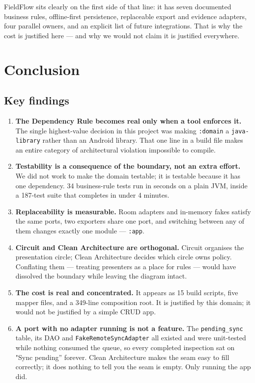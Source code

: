 \documentclass[11pt,a4paper]{article}
\newcommand{\mdl}[1]{\texttt{#1}}
\newcommand{\file}[1]{{\small\texttt{#1}}}
\begin{document}
FieldFlow sits clearly on the first side of that line: it has seven documented
business rules, offline-first persistence, replaceable export and evidence
adapters, four parallel owners, and an explicit list of future integrations. That
is why the cost is justified here --- and why we would not claim it is justified
everywhere.

\section{Conclusion}

\subsection{Key findings}

\begin{enumerate}[leftmargin=*]
  \item \textbf{The Dependency Rule becomes real only when a tool enforces it.}
        The single highest-value decision in this project was making
        \mdl{:domain} a \texttt{java-library} rather than an Android library.
        That one line in a build file makes an entire category of architectural
        violation impossible to compile.
  \item \textbf{Testability is a consequence of the boundary, not an extra
        effort.} We did not work to make the domain testable; it is testable
        because it has one dependency. 34 business-rule tests run in seconds on
        a plain JVM, inside a 187-test suite that completes in under 4 minutes.
  \item \textbf{Replaceability is measurable.} Room adapters and in-memory fakes
        satisfy the same ports, two exporters share one port, and switching
        between any of them changes exactly one module --- \mdl{:app}.
  \item \textbf{Circuit and Clean Architecture are orthogonal.} Circuit organises
        the presentation circle; Clean Architecture decides which circle owns
        policy. Conflating them --- treating presenters as a place for rules ---
        would have dissolved the boundary while leaving the diagram intact.
  \item \textbf{The cost is real and concentrated.} It appears as 15 build
        scripts, five mapper files, and a 349-line composition root. It is
        justified by this domain; it would not be justified by a simple CRUD app.
  \item \textbf{A port with no adapter running is not a feature.} The
        \texttt{pending\_sync} table, its DAO and \file{FakeRemoteSyncAdapter}
        all existed and were unit-tested while nothing consumed the queue, so
        every completed inspection sat on "Sync pending'' forever. Clean
        Architecture makes the seam easy to fill correctly; it does nothing to
        tell you the seam is empty. Only running the app did.
\end{enumerate}
\end{document}
